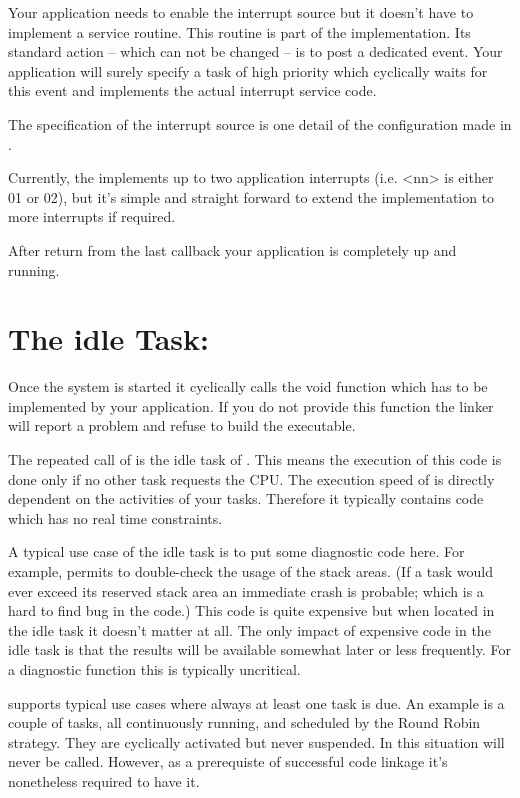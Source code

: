 Your application needs to enable the interrupt source but it doesn't have
to implement a service routine. This routine is part of the \rtos{}
implementation. Its standard action -- which can not be changed -- is to
post a dedicated event. Your application will surely specify a task of
high priority which cyclically waits for this event and implements the
actual interrupt service code.

The specification of the interrupt source is one detail of the \rtos{}
configuration made in .

Currently, the \rtos{} implements up to two application interrupts (i.e.
\textless nn\textgreater{} is either 01 or 02), but it's simple and
straight forward to extend the implementation to more interrupts if
required.

After return from the last callback  your application is completely up and running.


\section{The idle Task: }

Once the system is started it cyclically calls the void function
 which has to be implemented by your application. If you do
not provide this function the linker will report a problem and refuse to
build the executable.

The repeated call of  is the idle task of \rtos{}. This means
the execution of this code is done only if no other task requests the
CPU. The execution speed of  is directly dependent on the
activities of your tasks. Therefore it typically contains code which has
no real time constraints.

A typical use case of the idle task is to put some diagnostic code here.
For example, \rtos{} permits to double-check the usage of the stack areas.
(If a task would ever exceed its reserved stack area an immediate crash is
probable; which is a hard to find bug in the code.) This code is quite
expensive but when located in the idle task it doesn't matter at all. The
only impact of expensive code in the idle task is that the results will be
available somewhat later or less frequently. For a diagnostic function
this is typically uncritical.

\rtos{} supports typical use cases where always at least one task is due.
An example is a couple of tasks, all continuously running, and scheduled
by the Round Robin strategy. They are cyclically activated but never
suspended. In this situation  will never be called. However,
as a prerequiste of successful code linkage it's nonetheless required to
have it.

